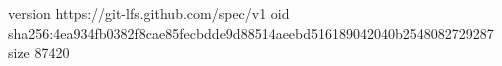 version https://git-lfs.github.com/spec/v1
oid sha256:4ea934fb0382f8cae85fecbdde9d88514aeebd516189042040b2548082729287
size 87420
